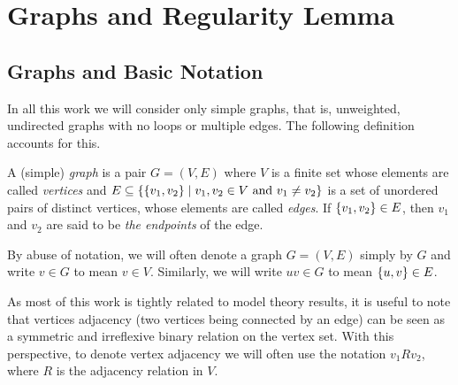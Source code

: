 \section{Graphs and Regularity Lemma} \label{sec:section_2}



    \subsection{Graphs and Basic Notation} \label{subsec:subsection_2.1}

        In all this work we will consider only simple graphs, that is, unweighted, undirected graphs with no loops or
        multiple edges.
        The following definition accounts for this.

        \begin{definition}
            A (simple) \emph{graph} is a pair $G = (V, E)$ where $V$ is a finite set whose elements are called \emph{vertices}
            and $E \subseteq \{ \{ v_1, v_2 \} \mid v_1, v_2 \in V \text{ and } v_1 \neq v_2 \}$ is a set of
            unordered pairs of distinct vertices, whose elements are called \emph{edges}.
            If $\{ v_1, v_2 \} \in E$, then $v_1$ and $v_2$ are said to be \emph{the endpoints} of the edge.
        \end{definition}


        By abuse of notation, we will often denote a graph $G = (V, E)$ simply by $G$ and write $v \in G$ to mean $v \in V$.
        Similarly, we will write $u v \in G$ to mean $\{ u, v \} \in E$.

        As most of this work is tightly related to model theory results, it is useful to note that vertices adjacency
        (two vertices being connected by an edge) can be seen as a symmetric and irreflexive binary relation on the
        vertex set.
        With this perspective, to denote vertex adjacency we will often use the notation $v_1 R v_2$, where $R$ is the
        adjacency relation in $V$.

